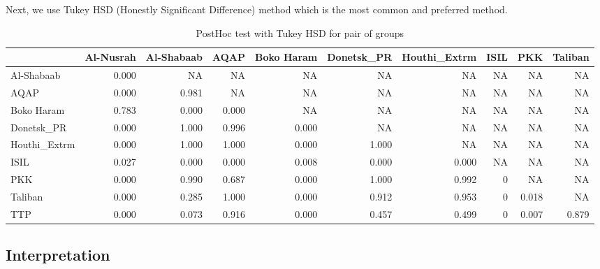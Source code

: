 \documentclass[11pt,oneside,a4paper]{reedthesis}
\newenvironment{Shaded}{\begin{snugshade}}{\end{snugshade}}
\newcommand{\KeywordTok}[1]{\textcolor[rgb]{0.13,0.29,0.53}{\textbf{#1}}}
\newcommand{\DataTypeTok}[1]{\textcolor[rgb]{0.13,0.29,0.53}{#1}}
\newcommand{\DecValTok}[1]{\textcolor[rgb]{0.00,0.00,0.81}{#1}}
\newcommand{\StringTok}[1]{\textcolor[rgb]{0.31,0.60,0.02}{#1}}
\newcommand{\CommentTok}[1]{\textcolor[rgb]{0.56,0.35,0.01}{\textit{#1}}}
\newcommand{\OtherTok}[1]{\textcolor[rgb]{0.56,0.35,0.01}{#1}}
\newcommand{\OperatorTok}[1]{\textcolor[rgb]{0.81,0.36,0.00}{\textbf{#1}}}
\newcommand{\NormalTok}[1]{#1}
\begin{document}
Next, we use Tukey HSD (Honestly Significant Difference) method which is
the most common and preferred method.
\begin{Shaded}
\end{Shaded}
\begin{table}[H]

\caption{\label{tab:unnamed-chunk-34}PostHoc test with Tukey HSD for pair of groups}
\centering
\fontsize{7}{9}\selectfont
\begin{tabular}[t]{lrrrrrrrrr}
\toprule
  & Al-Nusrah & Al-Shabaab & AQAP & Boko Haram & Donetsk\_PR & Houthi\_Extrm & ISIL & PKK & Taliban\\
\midrule
Al-Shabaab & 0.000 & NA & NA & NA & NA & NA & NA & NA & NA\\
AQAP & 0.000 & 0.981 & NA & NA & NA & NA & NA & NA & NA\\
Boko Haram & 0.783 & 0.000 & 0.000 & NA & NA & NA & NA & NA & NA\\
Donetsk\_PR & 0.000 & 1.000 & 0.996 & 0.000 & NA & NA & NA & NA & NA\\
Houthi\_Extrm & 0.000 & 1.000 & 1.000 & 0.000 & 1.000 & NA & NA & NA & NA\\
\addlinespace
ISIL & 0.027 & 0.000 & 0.000 & 0.008 & 0.000 & 0.000 & NA & NA & NA\\
PKK & 0.000 & 0.990 & 0.687 & 0.000 & 1.000 & 0.992 & 0 & NA & NA\\
Taliban & 0.000 & 0.285 & 1.000 & 0.000 & 0.912 & 0.953 & 0 & 0.018 & NA\\
TTP & 0.000 & 0.073 & 0.916 & 0.000 & 0.457 & 0.499 & 0 & 0.007 & 0.879\\
\bottomrule
\end{tabular}
\end{table}
\subsection{Interpretation}\label{interpretation}
\end{document}
